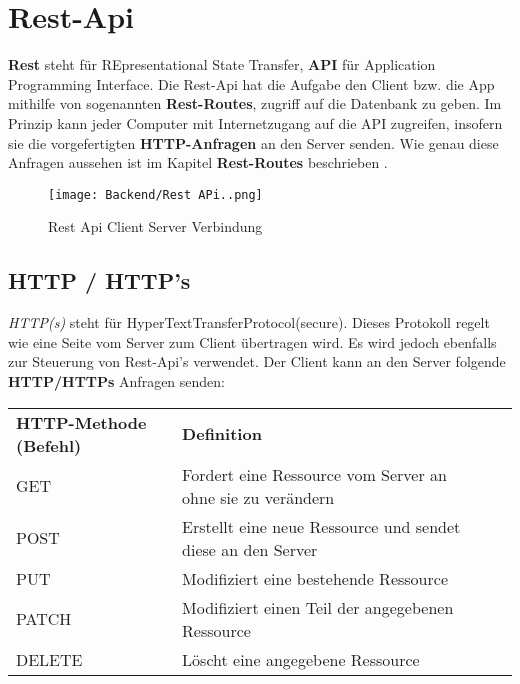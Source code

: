 \section{Rest-Api}
\label{restapi}

\textbf{Rest} steht für REpresentational State Transfer, \textbf{API} für Application
Programming Interface. Die Rest-Api hat die Aufgabe den Client bzw. die App
mithilfe von sogenannten \textbf{Rest-Routes}, zugriff auf die Datenbank zu geben.
Im Prinzip kann jeder Computer mit Internetzugang auf die API zugreifen, insofern
sie die vorgefertigten \textbf{HTTP-Anfragen} an den Server senden. Wie genau diese
Anfragen aussehen ist im Kapitel \textbf{Rest-Routes} beschrieben \underline{}.

\begin{figure}[H]
    \begin{center}
        \texttt{[image: Backend/Rest APi..png]}
    \end{center}
    \caption{Rest Api Client Server Verbindung}
\end{figure}

\subsection{HTTP / HTTP's}
\textit{HTTP(s)} steht für HyperTextTransferProtocol(secure).
Dieses Protokoll regelt wie eine Seite vom Server zum Client übertragen wird.
Es wird jedoch ebenfalls zur Steuerung von Rest-Api's verwendet. Der Client
kann an den Server folgende \textbf{HTTP/HTTPs} Anfragen senden:

\begin{table}
    \centering
    \begin{tabular}{llll}
        \textbf{HTTP-Methode (Befehl)} & \textbf{Definition}                                         &  & \\
        GET                            & Fordert eine Ressource vom Server an ohne sie zu verändern  &  & \\
        POST                           & Erstellt eine neue Ressource und sendet diese an den Server &  & \\
        PUT                            & Modifiziert eine bestehende Ressource                       &  & \\
        PATCH                          & Modifiziert einen Teil der angegebenen Ressource            &  & \\
        DELETE                         & Löscht eine angegebene Ressource                            &  &
    \end{tabular}
\end{table}
